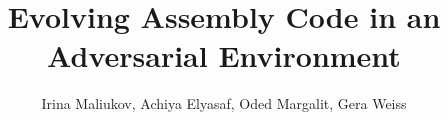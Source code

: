 \documentclass[dvipsnames, format=sigconf]{acmart}
\begin{document}
\title{Evolving Assembly Code in an Adversarial Environment}

\author{Irina Maliukov, Achiya Elyasaf, Oded Margalit, Gera Weiss}


\renewcommand{\shortauthors}{Maliukov et al.}
\end{document}
